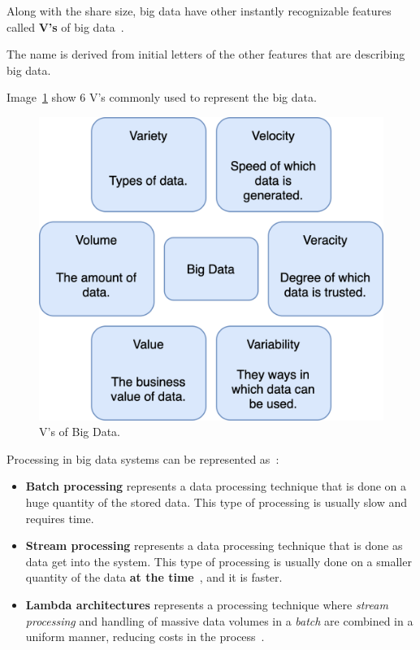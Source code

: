 \noindent
Along with the share size, big data have other instantly recognizable features called \textbf{V's} of big data~\cite{PatgiriA16}. 

The name is derived from initial letters of the other features that are describing big data. 

Image~\ref{fig:fig3} show 6 V's commonly used to represent the big data.

\begin{figure}[H]
	\begin{center}
		\includegraphics[scale=0.7]{images/Figure3}
	\end{center}
	\vspace{-0.6cm}
	\caption{V's of Big Data.}
	\label{fig:fig3}
\end{figure}

\noindent
Processing in big data systems can be represented as~\cite{phdthesis, KiranMMDB15}:

\begin{itemize}
	\item \textbf{Batch processing} represents a data processing technique that is done on a huge quantity of the stored data. This type of processing is usually slow and requires time.
	\item \textbf{Stream processing} represents a data processing technique that is done as data get into the system. This type of processing is usually done on a smaller quantity of the data \textbf{at the time}~\cite{medjedovic2022algorithms}, and it is faster.
	\item \textbf{Lambda architectures} represents a processing technique where \emph{stream processing} and handling of massive data volumes in a \emph{batch} are combined in a uniform manner, reducing costs in the process~\cite{KiranMMDB15}.
\end{itemize}

